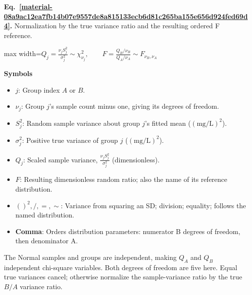 \documentclass[11pt,a4paper]{article}
\begin{document}
\par\medskip
\begin{samepage}
\label{material-08a9ac12ea7fb14b07e9557de8a815133ecb6d81c265ba155e656d924fed69d4}
\noindent\textbf{Eq.~\ref*{material-08a9ac12ea7fb14b07e9557de8a815133ecb6d81c265ba155e656d924fed69d4}.} Normalization by the true variance ratio and the resulting ordered F reference.\par\nopagebreak
\begin{center}\begin{adjustbox}{max width=\linewidth}$\displaystyle Q_j=\frac{\nu_j S_j^2}{\sigma_j^2}\sim\chi^2_{\nu_j},\qquad F=\frac{Q_B/\nu_B}{Q_A/\nu_A}\sim F_{\nu_B,\nu_A}$\end{adjustbox}\end{center}

\par\noindent\textbf{Symbols}

\begin{itemize}\setlength{\itemsep}{1pt}\setlength{\parsep}{0pt}
\item \textbf{\(j\)}: Group index \(A\) or \(B\).
\item \textbf{\(ν_j\)}: Group \(j\)'s sample count minus one, giving its degrees of freedom.
\item \textbf{\(S_j^2\)}: Random sample variance about group \(j\)'s fitted mean (\(\mathrm{(mg/L)^2}\)).
\item \textbf{\(σ_j^2\)}: Positive true variance of group \(j\) (\(\mathrm{(mg/L)^2}\)).
\item \textbf{\(Q_j\)}: Scaled sample variance, \(\frac{ν_j S_j^2}{σ_j^2}\) (dimensionless).
\item \textbf{\(F\)}: Resulting dimensionless random ratio; also the name of its reference distribution.
\item \textbf{\(()^2, /, =, ∼\)}: Variance from squaring an SD; division; equality; follows the named distribution.
\item \textbf{Comma}: Orders distribution parameters: numerator B degrees of freedom, then denominator A.
\end{itemize}

The Normal samples and groups are independent, making \(Q_A\) and \(Q_B\) independent chi-square variables. Both degrees of freedom are five here. Equal true variances cancel; otherwise normalize the sample-variance ratio by the true \(B/A\) variance ratio.

\end{samepage}
\medskip
\end{document}
